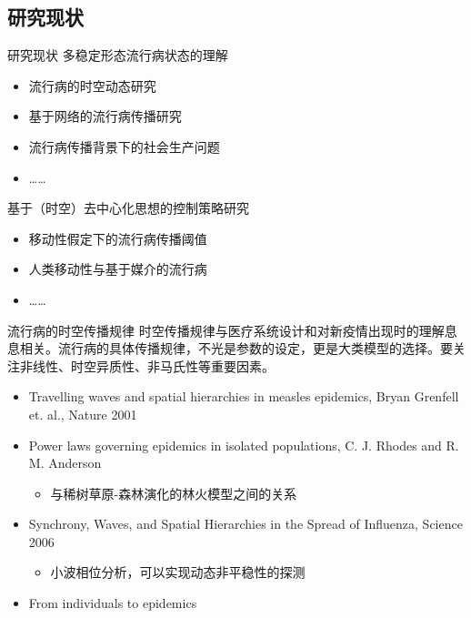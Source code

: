 \subsection{研究现状}

\begin{frame}{研究现状}
多稳定形态流行病状态的理解
    \begin{itemize}
        \item 流行病的时空动态研究
        \item 基于网络的流行病传播研究
        \item 流行病传播背景下的社会生产问题
        \item ……
    \end{itemize}
\pause
基于（时空）去中心化思想的控制策略研究
\begin{itemize}
    \item 移动性假定下的流行病传播阈值
    \item 人类移动性与基于媒介的流行病
    \item ……
\end{itemize}
\end{frame}

\begin{frame}{流行病的时空传播规律}
    时空传播规律与医疗系统设计和对新疫情出现时的理解息息相关。流行病的具体传播规律，不光是参数的设定，更是大类模型的选择。要关注非线性、时空异质性、非马氏性等重要因素。
    \begin{itemize}
        \item Travelling waves and spatial hierarchies in measles epidemics, Bryan Grenfell et. al., Nature 2001
        \item Power laws governing epidemics in isolated populations, C. J. Rhodes and R. M. Anderson
        \begin{itemize}
            \item 与稀树草原-森林演化的林火模型之间的关系
        \end{itemize}
        \item Synchrony, Waves, and Spatial Hierarchies in the Spread of Influenza, Science 2006
        \begin{itemize}
            \item 小波相位分析，可以实现动态非平稳性的探测
        \end{itemize}
        \item From individuals to epidemics
    \end{itemize}
\end{frame}

